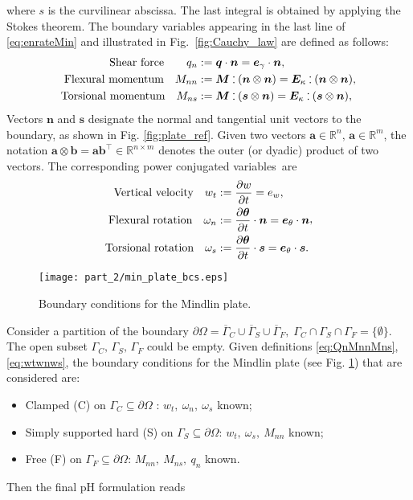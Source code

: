 where $s$ is the curvilinear abscissa. The last integral is obtained by applying the Stokes theorem. The boundary variables appearing in the last line of \eqref{eq:enrateMin} and illustrated in Fig.~\ref{fig:Cauchy_law} are defined as follows:
\begin{equation}
\label{eq:QnMnnMns}
\begin{aligned}
\text{Shear force}  \qquad q_{n} &:= \bm{q} \cdot \bm{n}=  \bm{e}_{\gamma} \cdot \bm{n},  \\
\text{Flexural momentum} \quad 
M_{nn} &:=  \bm{M} \cddot (\bm{n}\otimes{\bm{n}}) = \bm{E}_{\kappa} \cddot (\bm{n}\otimes{\bm{n}}) 	\\
\text{Torsional momentum} \quad M_{ns} &:= \bm{M} \cddot (\bm{s}\otimes{\bm{n}}) = \bm{E}_{\kappa} \cddot (\bm{s}\otimes{\bm{n}}),	
\end{aligned},
\end{equation}
Vectors $\bm{n}$ and $\bm{s}$ designate the normal and tangential unit vectors to the boundary, as shown in Fig. \ref{fig:plate_ref}. Given two vectors $\bm{a} \in \mathbb{R}^n, \, \bm{a} \in \mathbb{R}^m$, the notation $\bm{a}\otimes{\bm{b}} = \bm{a} \bm{b}^\top \in \mathbb{R}^{n\times m}$ denotes the outer (or dyadic) product of two vectors.  The corresponding power conjugated variables~are
\begin{equation} 
\label{eq:wtwnws}
\begin{aligned}
\text{Vertical velocity}  \quad w_t &:= \diffp{w}{t} = e_w, \\
\text{Flexural rotation} \quad 
\omega_{n} &:= \diffp{\bm{\theta}}{t} \cdot \bm{n} = \bm{e}_\theta \cdot \bm{n} \\
\text{Torsional rotation} \quad 
\omega_{s} &:= \diffp{\bm{\theta}}{t} \cdot \bm{s} = \bm{e}_\theta \cdot \bm{s}.	
\end{aligned},
\end{equation}

\begin{figure}[tb]
	\centering
	\texttt{[image: part\_2/min\_plate\_bcs.eps]}
	\caption{Boundary conditions for the Mindlin plate.}
	\label{fig:bcs_min}
\end{figure}
Consider a partition of the boundary $\partial \Omega  = \overline{\Gamma}_{C} \cup \overline{\Gamma}_{S} \cup \overline{\Gamma}_{F}, \; {\Gamma}_{C} \cap {\Gamma}_{S} \cap {\Gamma}_{F} = \{\emptyset\}$. The open subset $\Gamma_{C}, \, \Gamma_{S}, \, \Gamma_{F}$ could be empty. Given definitions \eqref{eq:QnMnnMns}, \eqref{eq:wtwnws}, the boundary conditions for the Mindlin plate \cite{duran1999approximation} (see Fig. \ref{fig:bcs_min}) that are considered are:
\begin{itemize}
\item Clamped (C) on $\Gamma_{C}\subseteq \partial \Omega$ : $w_t, \ \omega_{n}, \ \omega_{s}$ known;
\item Simply supported hard (S) on $\Gamma_{S}\subseteq \partial \Omega$: $w_t, \ \omega_{s}, \ M_{nn}$ known;
\item Free (F) on $\Gamma_{F}\subseteq \partial \Omega$: $M_{nn}, \ M_{ns}, \ q_n$ known.
\end{itemize}
Then the final pH formulation reads


